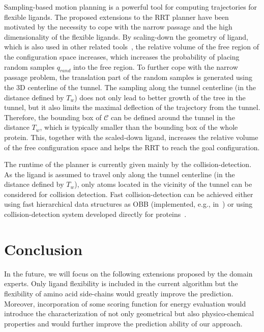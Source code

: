 \documentclass{svmult}
\def\qrand{q_{rand}}
\def\C{\mathcal{C}}
\def\rv{T_w}
\begin{document}
Sampling-based motion planning is a powerful tool for computing trajectories for flexible ligands.
The proposed extensions to the RRT planner have been motivated by the necessity to cope with the narrow passage
and the high dimensionality of the flexible ligands.
By scaling-down the geometry of ligand, which is also used in other related tools~\cite{cortes2005path}, 
the relative volume of the free region of the configuration space increases, which increases the probability of placing
random samples $\qrand$ into the free region.
To further cope with the narrow passage problem, the translation part of the random samples is generated using
the 3D centerline of the tunnel.
The sampling along the tunnel centerline (in the distance defined by $\rv$) does not only lead to better growth of the tree in the tunnel, but it also limits the maximal deflection of the trajectory from the tunnel.
Therefore, the bounding box of $\C$ can be defined around the tunnel in the distance $\rv$, which is typically
smaller than the bounding box of the whole protein.
This, together with the scaled-down ligand, increases the relative volume of the free configuration space and helps the RRT to
reach the goal configuration.

The runtime of the planner is currently given mainly by the collision-detection.
As the ligand is assumed to travel only along the tunnel centerline (in the distance defined by $\rv$),
only atoms located in the vicinity of the tunnel can be considered for collision detection.
Fast collision-detection can be achieved either using fast hierarchical data structures as OBB (implemented, e.g., in~\cite{ozcollide})
    or using collision-detection system developed directly for proteins~\cite{ruiz2005biocd}.




\section{Conclusion }
In the future, we will focus on the following extensions proposed by the domain experts.
Only ligand flexibility is included in the current algorithm but the flexibility of amino acid side-chains would greatly improve the prediction. 
Moreover, incorporation of some scoring function for energy evaluation would introduce the characterization of not only geometrical but also physico-chemical properties and would further improve the prediction ability of our approach.




\end{document}
